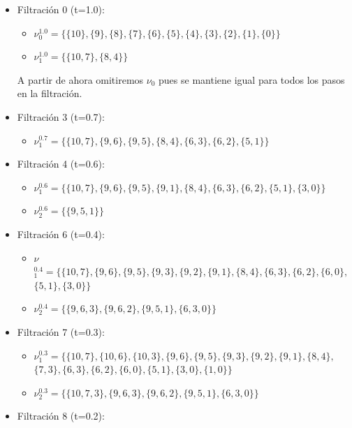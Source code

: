 \documentclass[12pt, a4paper, twoside]{book}
\numberwithin{equation}{section}
\theoremstyle{definition}
\newenvironment{ejem}
  {\pushQED{\qed}\renewcommand{\qedsymbol}{$\blacktriangleleft$}\ejemplo}
  {\popQED\endejemplo}
\theoremstyle{remark}
\theoremstyle{plain}
\begin{document}
\begin{ejem}
\begin{itemize}
			\item Filtración 0 (t=1.0):
				\begin{itemize}
					\item {\Large $\nu$}$^{1.0}_{0}=\{\{10\},\{9\},\{8\},\{7\},\{6\},\{5\},\{4\},\{3\},\{2\},\{1\},\{0\}\}$
					\item {\Large $\nu$}$^{1.0}_{1}=\{\{10, 7\},\{8, 4\}\}$
				\end{itemize}
				A partir de ahora omitiremos 
				{\Large $\nu$}$_{0}$ pues se mantiene igual 
				para todos los pasos en la filtración.
			\item Filtración 3 (t=0.7):
				\begin{itemize}
					\item {\Large $\nu$}$^{0.7}_{1}=\{\{10, 7\},\{9, 6\},\{9, 5\},\{8, 4\},\{6, 3\},\{6, 2\},\{5, 1\}\}$
				\end{itemize}
			\item Filtración 4 (t=0.6):
				\begin{itemize}
					\item {\Large $\nu$}$^{0.6}_{1}=\{\{10, 7\},\{9, 6\},\{9, 5\},\{9, 1\},\{8, 4\},\{6, 3\},\{6, 2\},\{5, 1\},\{3, 0\}\}$
					\item {\Large $\nu$}$^{0.6}_{2}=\{\{9, 5, 1\}\}$
				\end{itemize}
			\item Filtración 6 (t=0.4):
				\begin{itemize}
					\item {\Large $\nu$}$^{0.4}_{1}=\{\{10, 7\},\{9, 6\},\{9, 5\},\{9, 3\},\{9, 2\},\{9, 1\},\{8, 4\},\{6, 3\},\{6, 2\},
						\{6, 0\},$ \\$\{5, 1\},\{3, 0\}\}$
					\item {\Large $\nu$}$^{0.4}_{2}=\{\{9, 6, 3\},\{9, 6, 2\},\{9, 5, 1\},\{6, 3, 0\}\}$
				\end{itemize}
			\item Filtración 7 (t=0.3):
				\begin{itemize}
					\item {\Large $\nu$}$^{0.3}_{1}=\{\{10, 7\},\{10, 6\},\{10, 3\},\{9, 6\},\{9, 5\},\{9, 3\},\{9, 2\},\{9, 1\},\{8, 4\},$\\ 
							$\{7, 3\},\{6, 3\},\{6, 2\},\{6, 0\},\{5, 1\},\{3, 0\},\{1, 0\}\}$
					\item {\Large $\nu$}$^{0.3}_{2}=\{\{10, 7, 3\},\{9, 6, 3\},\{9, 6, 2\},\{9, 5, 1\},\{6, 3, 0\}\}$
				\end{itemize}
			\item Filtración 8 (t=0.2):
				\begin{itemize}

\end{itemize}
\end{itemize}
\end{ejem}
\end{document}
